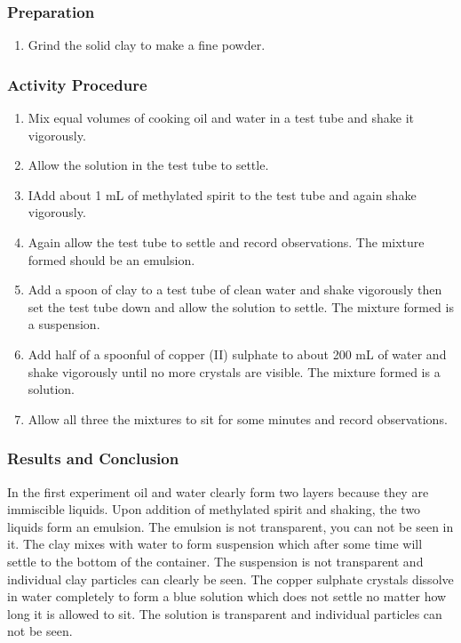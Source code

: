 \subsubsection*{Preparation}
\begin{enumerate}
\item{Grind the solid clay to make a fine powder.}
\end{enumerate}

\subsubsection*{Activity Procedure}
\begin{enumerate}
\item{Mix equal volumes of cooking oil and water in a test tube and shake it vigorously.}
\item{Allow the solution in the test tube to settle.}
\item{IAdd about 1 mL of methylated spirit to the test tube and again shake vigorously.}
\item{Again allow the test tube to settle and record observations. The mixture formed should be an emulsion.}
\item{Add a spoon of clay to a test tube of clean water and shake vigorously then set the test tube down and allow the solution to settle. The mixture formed is a suspension.}
\item{Add half of a spoonful of copper (II) sulphate to about 200 mL of water and shake vigorously until no more crystals are visible. The mixture formed is a solution.}
\item{Allow all three the mixtures to sit for some minutes and record observations.}
\end{enumerate}

\subsubsection*{Results and Conclusion}
In the first experiment oil and water clearly form two layers because they are immiscible liquids. Upon addition of methylated spirit and shaking, the two liquids form an emulsion. The emulsion is not transparent, you can not be seen in it.
The clay mixes with water to form suspension which after some time will settle to the bottom of the container. The suspension is not transparent and individual clay particles can clearly be seen.
The copper sulphate crystals dissolve in water completely to form a blue solution which does not settle no matter how long it is allowed to sit. The solution is transparent and individual particles can not be seen.

